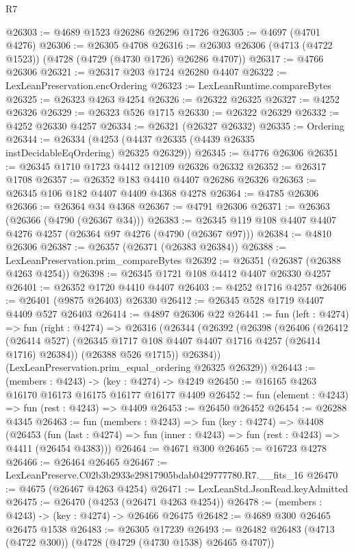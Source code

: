 \begin{lexlean}{R7}
\begin{coremodule}
@26303 := @4689 @1523 @26286 @26296 @1726
@26305 := @4697 (@4701 @4276)
@26306 := @26305 @4708
@26316 := @26303 @26306 (@4713 (@4722 @1523)) (@4728 (@4729 (@4730 @1726) @26286 @4707))
@26317 := @4766 @26306
@26321 := @26317 @203 @1724 @26280 @4407
@26322 := LexLeanPreservation.encOrdering
@26323 := LexLeanRuntime.compareBytes
@26325 := @26323 @4263 @4254
@26326 := @26322 @26325
@26327 := @4252 @26326
@26329 := @26323 @526 @1715
@26330 := @26322 @26329
@26332 := @4252 @26330 @4257
@26334 := @26321 (@26327 @26332)
@26335 := Ordering
@26344 := @26334 (@4253 (@4437 @26335 (@4439 @26335 instDecidableEqOrdering) @26325 @26329))
@26345 := @4776 @26306
@26351 := @26345 @1710 @1723 @4412 @12109 @26326 @26332
@26352 := @26317 @1708
@26357 := @26352 @183 @4410 @4407 @26286 @26326
@26363 := @26345 @106 @182 @4407 @4409 @4368 @4278
@26364 := @4785 @26306
@26366 := @26364 @34 @4368
@26367 := @4791 @26306
@26371 := @26363 (@26366 (@4790 (@26367 @34)))
@26383 := @26345 @119 @108 @4407 @4407 @4276 @4257 (@26364 @97 @4276 (@4790 (@26367 @97)))
@26384 := @4810 @26306
@26387 := @26357 (@26371 (@26383 @26384))
@26388 := LexLeanPreservation.prim_compareBytes
@26392 := @26351 (@26387 (@26388 @4263 @4254))
@26398 := @26345 @1721 @108 @4412 @4407 @26330 @4257
@26401 := @26352 @1720 @4410 @4407
@26403 := @4252 @1716 @4257
@26406 := @26401 (@9875 @26403) @26330
@26412 := @26345 @528 @1719 @4407 @4409 @527 @26403
@26414 := @4897 @26306 @22
@26441 := fun (left : @4274) =>
  fun (right : @4274) =>
  @26316
    (@26344
      (@26392
        (@26398
          (@26406
            (@26412 (@26414 @527) (@26345 @1717 @108 @4407 @4407 @1716 @4257 (@26414 @1716) @26384))
            (@26388 @526 @1715))
          @26384))
      (LexLeanPreservation.prim_equal_ordering @26325 @26329))
@26443 := (members : @4243) -> (key : @4274) -> @4249
@26450 := @16165 @4263 @16170 @16173 @16175 @16177 @16177 @4409
@26452 := fun (element : @4243) => fun (rest : @4243) => @4409
@26453 := @26450 @26452
@26454 := @26288 @4345
@26463 := fun (members : @4243) =>
  fun (key : @4274) =>
  @4408
    (@26453
      (fun (last : @4274) => fun (inner : @4243) => fun (rest : @4243) => @4411 (@26454 @4383)))
@26464 := @4671 @300
@26465 := @16723 @4278
@26466 := @26464 @26465
@26467 := LexLeanPreserve.C02b3b2933e29817905bdab0429777780.R7.__fits_16
@26470 := @4675 (@26467 @4263 @4254)
@26471 := LexLeanStd.JsonRead.keyAdmitted
@26475 := @26470 (@4253 (@26471 @4263 @4254))
@26478 := (members : @4243) -> (key : @4274) -> @26466 @26475
@26482 := @4689 @300 @26465 @26475 @1538
@26483 := @26305 @17239
@26493 := @26482 @26483 (@4713 (@4722 @300)) (@4728 (@4729 (@4730 @1538) @26465 @4707))

\end{coremodule}
\end{lexlean}

